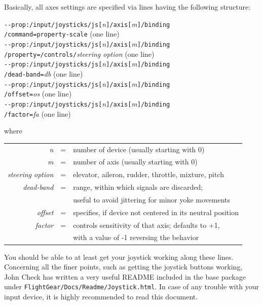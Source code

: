 Basically, all axes settings are specified via lines having the following structure:
 \medskip

\noindent
\texttt{-$ $-prop:/input/joysticks/js[}\textit{n}\texttt{]/axis[}\textit{m}\texttt{]/binding}\\
\texttt{/command=property-scale} (one line)\\
\texttt{-$ $-prop:/input/joysticks/js[}\textit{n}\texttt{]/axis[}\textit{m}\texttt{]/binding}\\
\texttt{/property=/controls/}\textit{steering option} (one line)\\
\texttt{-$ $-prop:/input/joysticks/js[}\textit{n}\texttt{]/axis[}\textit{m}\texttt{]/binding}\\
\texttt{/dead-band=}\textit{db} (one line)\\
\texttt{-$ $-prop:/input/joysticks/js[}\textit{n}\texttt{]/axis[}\textit{m}\texttt{]/binding}\\
\texttt{/offset=}\textit{os} (one line)\\
\texttt{-$ $-prop:/input/joysticks/js[}\textit{n}\texttt{]/axis[}\textit{m}\texttt{]/binding}\\
\texttt{/factor=}\textit{fa} (one line)\\
\medskip

 \noindent
 where
 \medskip

\begin{tabular}{rcl}
 \textit{n} &=& number of device (usually starting with 0)\\
 \textit{m} &=& number of axis (usually starting with 0)\\
 \textit{steering option} &=& elevator, aileron, rudder, throttle, mixture, pitch\\
 \textit{dead-band} &=& range, within which signals are discarded;\\
                   && useful to avoid jittering for minor yoke movements\\
 \textit{offset} &=& specifies, if device not centered in its neutral position\\
  \textit{factor} &=& controls sensitivity of that axis; defaults to +1,\\
                 &&with a value of -1 reversing the behavior
  \end{tabular}
 \medskip

You should be able to at least get your joystick working along
these lines. Concerning all the finer points, such as getting the joystick buttons
working, John Check has written a very useful README  included in the base package under \texttt{FlightGear/Docs/Readme/Joystick.html}. In case of any trouble with your input device, it is highly recommended to read this document.

